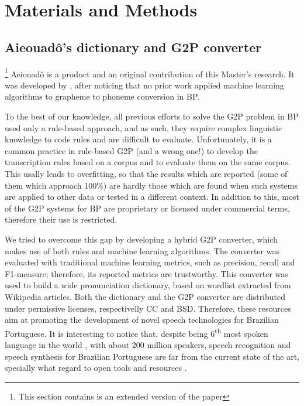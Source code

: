 
\chapter{Materials and Methods}\label{ch:methods}

\section{Aieouad\^o's dictionary and G2P converter}\label{sec:aieouado}
\footnote{This section contains is an extended version of the paper}
Aeiouad\^o is a product and an original contribution of this Master's research. It was developed by \citeauthor{Mendonca2014} \cite{Mendonca2014}, after noticing that no prior work applied machine learning algorithms to grapheme to phoneme conversion in \ac{BP}.

To the best of our knowledge, all previous efforts to solve the G2P problem in \ac{BP} used only a rule-based approach, and as such, they require complex linguistic knowledge to code rules and are difficult to evaluate. Unfortunately, it is a common practice in rule-based G2P (and a wrong one!) to develop the transcription rules based on a corpus and to evaluate them on the same corpus. This usally leads to overfitting, so that the results which are reported (some of them which approach 100\%) are hardly those which are found when such systems are applied to other data or tested in a different context. In addition to this, most of the G2P systems for \ac{BP} are proprietary or licensed under commercial terms, therefore their use is restricted.

We tried to overcome this gap by developing a hybrid G2P converter, which makes use of both rules and machine learning algorithms. The converter was evaluated with traditional machine learning metrics, such as precision, recall and F1-measure; therefore, its reported metrics are trustworthy. This converter was used to build a wide pronunciation dictionary, based on wordlist extracted from Wikipedia articles. Both the dictionary and the G2P converter are distributed under permissive licenses, respectivelly \ac{CC} and \ac{BSD}. Therefore, these resources aim at promoting the development of novel speech technologies for Brazilian Portuguese. It is interesting to notice that, despite being 6\textsuperscript{th} most spoken language in the world \cite{Ethnologue2013}, with about 200 million speakers, speech recognition and speech synthesis for Brazilian Portuguese are far from the current state of the art, specially what regard to open tools and resources \cite{Neto2011}. 

